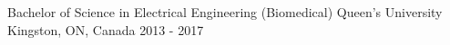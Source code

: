 

\begin{cventries}
  \cventry
    {Bachelor of Science in Electrical Engineering (Biomedical)} %
    {Queen's University} %
    {Kingston, ON, Canada} %
    {2013 - 2017} %
{}
{}
\end{cventries}
